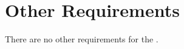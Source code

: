 \KNEADSECTIONNEWPAGE
\section{Other Requirements}
\label{lab:sec_OtherRequirements}
% 
There are no other requirements for the \ThisSystem.
% 

% 
